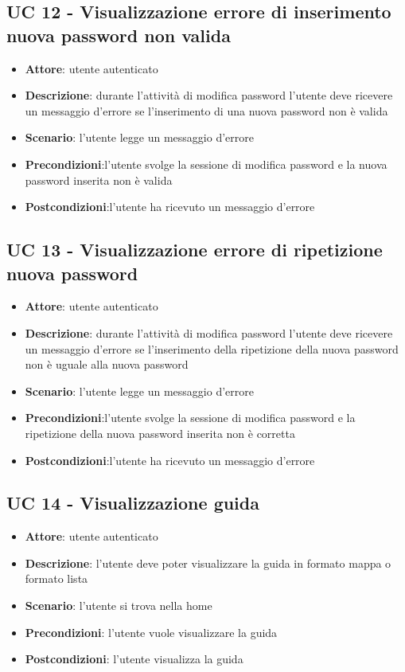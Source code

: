 \subsection{UC 12 - Visualizzazione errore di inserimento nuova password non valida}
\begin{itemize}
    \item \textbf{Attore}: utente autenticato
    \item \textbf{Descrizione}: durante l’attività di modifica password l’utente deve ricevere un messaggio d’errore se l'inserimento di una nuova password non è valida
    \item \textbf{Scenario}: l’utente legge un messaggio d’errore
    \item \textbf{Precondizioni}:l’utente svolge la sessione di modifica password e la nuova password inserita non è valida
    \item \textbf{Postcondizioni}:l’utente ha ricevuto un messaggio d’errore
\end{itemize}

\subsection{UC 13 - Visualizzazione errore di ripetizione nuova password}
\begin{itemize}
    \item \textbf{Attore}: utente autenticato
    \item \textbf{Descrizione}: durante l’attività di modifica password l’utente deve ricevere un messaggio d’errore se l'inserimento della ripetizione della nuova password non è uguale alla nuova password 
    \item \textbf{Scenario}: l’utente legge un messaggio d’errore
    \item \textbf{Precondizioni}:l’utente svolge la sessione di modifica password e la ripetizione della nuova password inserita non è corretta
    \item \textbf{Postcondizioni}:l’utente ha ricevuto un messaggio d’errore
\end{itemize}

\subsection{UC 14 - Visualizzazione guida}
\begin{itemize}
    \item \textbf{Attore}: utente autenticato
    \item \textbf{Descrizione}: l’utente deve poter visualizzare la guida in formato mappa o formato lista
    \item \textbf{Scenario}: l’utente si trova nella home
    \item \textbf{Precondizioni}: l’utente vuole visualizzare la guida
    \item \textbf{Postcondizioni}: l’utente visualizza la guida
\end{itemize}

